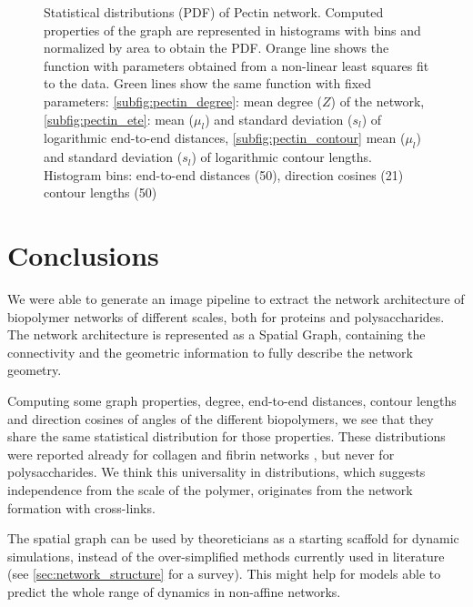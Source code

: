 \begin{figure}[H]
\begin{subfigure}{0.5\textwidth}
  \end{subfigure}
  \caption{Statistical distributions (PDF) of Pectin network. Computed properties of the graph are represented in histograms with bins and normalized by area to obtain the PDF. Orange line shows the function with parameters obtained from a non-linear least squares fit to the data.
    Green lines show the same function with fixed parameters: \ref{subfig:pectin_degree}: mean degree ($Z$) of the network, \ref{subfig:pectin_ete}: mean ($\mu_l$) and standard deviation ($s_l$) of logarithmic end-to-end distances,
  \ref{subfig:pectin_contour} mean ($\mu_l$) and standard deviation ($s_l$) of logarithmic contour lengths.
Histogram bins: end-to-end distances (50), direction cosines (21) contour lengths (50) }
  \label{fig:pectin_thin}
\end{figure}

\section{Conclusions}%
\label{sec:conclusions_image}

We were able to generate an image pipeline to extract the network architecture
of biopolymer networks of different scales, both for proteins and polysaccharides.
The network architecture is represented as a \gls{Spatial Graph}, containing the connectivity and
the geometric information to fully describe the network geometry.

Computing some graph properties, degree, end-to-end distances, contour lengths and direction cosines of angles of the different biopolymers, we see that they share the same statistical distribution for those properties. These distributions were reported already for collagen and fibrin networks \cite{lindstrom_finite-strain_2013}, but never for polysaccharides. We think this universality in distributions, which suggests independence from the scale of the polymer, originates from the network formation with cross-links.

The spatial graph can be used by theoreticians as a starting scaffold for dynamic simulations, instead of the over-simplified methods currently used in literature (see \autoref{sec:network_structure} for a survey). This might help for models able to predict the whole range of dynamics in non-affine networks.%

